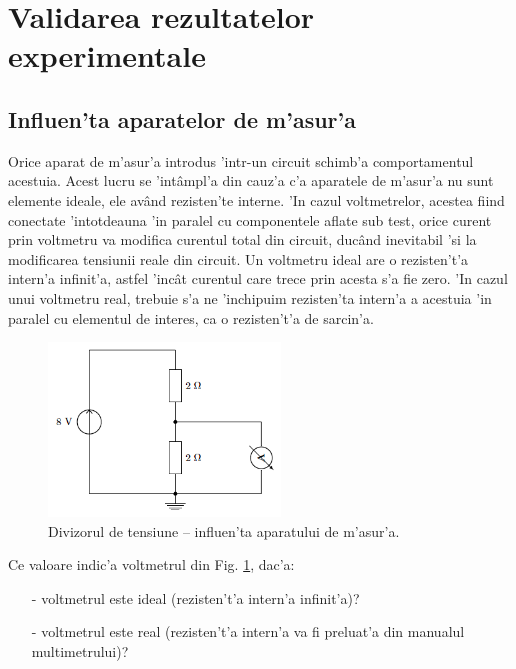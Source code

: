 \section{Validarea rezultatelor experimentale}

\subsection*{Influen'ta aparatelor de m'asur'a}

Orice aparat de m'asur'a introdus 'intr-un circuit schimb'a comportamentul acestuia. Acest lucru se 'int\^ampl'a din cauz'a c'a aparatele de m'asur'a nu sunt elemente ideale, ele av\^and rezisten'te interne.
%
'In cazul voltmetrelor, acestea fiind conectate 'intotdeauna 'in paralel cu componentele aflate sub test, orice curent prin voltmetru va modifica curentul total din circuit, duc\^and inevitabil 'si la modificarea tensiunii reale din circuit. Un voltmetru ideal are o rezisten't'a intern'a infinit'a, astfel 'inc\^at curentul care trece prin acesta s'a fie zero. 'In cazul unui voltmetru real, trebuie s'a ne 'inchipuim rezisten'ta intern'a a acestuia 'in paralel cu elementul de interes, ca o rezisten't'a de sarcin'a.
\begin{figure}[!b]
	\centering
		\includegraphics[width=0.55\textwidth]{laborator_01/figuri/5_divizor_cu_voltmetru}
	\caption{Divizorul de tensiune -- influen'ta aparatului de m'asur'a.}
	\label{fig:divizor_cu_voltmetru}
\end{figure}

\begin{exercise}
Ce valoare indic'a voltmetrul din Fig. \ref{fig:divizor_cu_voltmetru}, dac'a:
\begin{itemize}
\item[-] voltmetrul este ideal (rezisten't'a intern'a infinit'a)?
\item[-] voltmetrul este real (rezisten't'a intern'a va fi preluat'a din manualul multimetrului)? %
\end{itemize}
\end{exercise}



